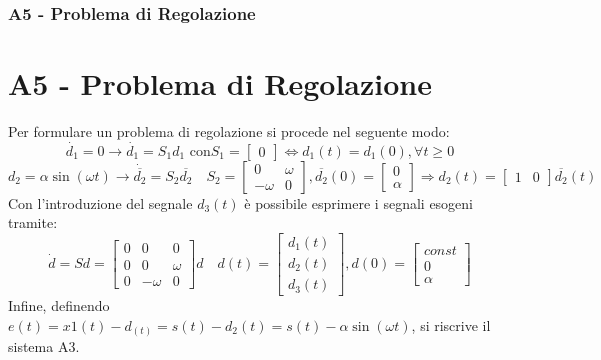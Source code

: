\documentclass{beamer}
\begin{document}
\begin{frame}
	\frametitle{A5 - Problema di Regolazione}%
	\section{A5 - Problema di Regolazione}%
	Per formulare un problema di regolazione si procede nel seguente modo:
	\begin{equation*}
		\dot{d_{1}}=0\rightarrow \dot{d_{1}}=S_{1}d_{1}\text{ con} S_{1}=\begin{bmatrix}
			0
		\end{bmatrix}\Longleftrightarrow d_{1}(t)=d_{1}(0),\forall t\geq 0
	\end{equation*}
	\begin{equation*}
		d_{2}=\alpha\sin{(\omega t)}\rightarrow \dot{\overline{d_2}}=S_{2}\overline{d_{2}}\quad S_{2}=\begin{bmatrix}
			0       & \omega \\
			-\omega & 0
		\end{bmatrix},\overline{d_{2}}(0)=\begin{bmatrix}
			0 \\\alpha
		\end{bmatrix}\Rightarrow d_{2}(t)=\begin{bmatrix}
			1 & 0
		\end{bmatrix}\overline{d_{2}}(t)
	\end{equation*}
	Con l'introduzione del segnale \(d_{3}(t)\) è possibile esprimere i segnali esogeni tramite:
	\begin{equation*}
		\dot{d}=Sd=\begin{bmatrix}
			0 & 0 & 0 \\ 0&0&\omega \\0&-\omega & 0
		\end{bmatrix}d\quad d(t)=\begin{bmatrix}
			d_{1}(t) \\d_{2}(t)\\d_{3}(t)
		\end{bmatrix},d(0)=\begin{bmatrix}
			const \\0\\\alpha
		\end{bmatrix}
	\end{equation*}
	Infine, definendo \(e(t)=x{1}(t)-d_(t)=s(t)-d_{2}(t)=s(t)-\alpha\sin{(\omega t)}\), si riscrive il sistema A3.

\end{frame}
\end{document}
